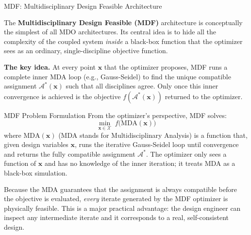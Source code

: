 \documentclass[aspectratio=169,10pt]{beamer}
\begin{document}
\begin{frame}[allowframebreaks]{MDF: Multidisciplinary Design Feasible Architecture}

  The \textbf{Multidisciplinary Design Feasible (MDF)} architecture is
  conceptually the simplest of all MDO architectures.  Its central idea
  is to hide all the complexity of the coupled system \emph{inside} a
  black-box function that the optimizer sees as an ordinary, single-discipline
  objective function.

  \textbf{The key idea.}  At every point $\mathbf{x}$ that the optimizer
  proposes, MDF runs a complete inner MDA loop (e.g., Gauss-Seidel) to
  find the unique compatible assignment $\mathcal{A}^*(\mathbf{x})$ such
  that all disciplines agree.  Only once this inner convergence is achieved
  is the objective $f(\mathcal{A}^*(\mathbf{x}))$ returned to the optimizer.

  \begin{block}{MDF Problem Formulation}
    From the optimizer's perspective, MDF solves:
    \[
      \min_{\mathbf{x} \in \mathcal{X}}\;
      f\!\bigl(\mathrm{MDA}(\mathbf{x})\bigr)
    \]
    where $\mathrm{MDA}(\mathbf{x})$ (MDA stands for Multidisciplinary
    Analysis) is a function that, given design variables $\mathbf{x}$,
    runs the iterative Gauss-Seidel loop until convergence and returns
    the fully compatible assignment $\mathcal{A}^*$.  The optimizer only
    sees a function of $\mathbf{x}$ and has no knowledge of the inner
    iteration; it treats MDA as a black-box simulation.
  \end{block}

  \medskip
  Because the MDA guarantees that the assignment is always compatible
  before the objective is evaluated, \emph{every} iterate generated by
  the MDF optimizer is physically feasible.  This is a major practical
  advantage: the design engineer can inspect any intermediate iterate and
  it corresponds to a real, self-consistent design.

  \framebreak


\end{frame}
\end{document}
